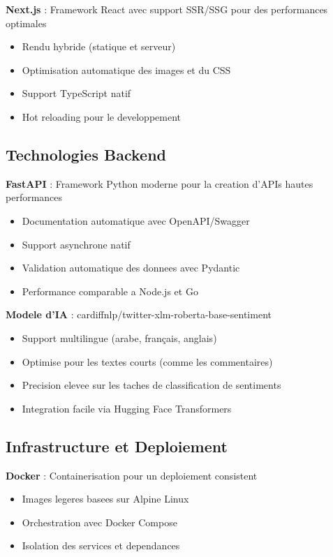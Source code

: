 \textbf{Next.js} : Framework React avec support SSR/SSG pour des performances optimales
\begin{itemize}
    \item Rendu hybride (statique et serveur)
    \item Optimisation automatique des images et du CSS
    \item Support TypeScript natif
    \item Hot reloading pour le developpement
\end{itemize}

\subsection{Technologies Backend}

\textbf{FastAPI} : Framework Python moderne pour la creation d'APIs hautes performances
\begin{itemize}
    \item Documentation automatique avec OpenAPI/Swagger
    \item Support asynchrone natif
    \item Validation automatique des donnees avec Pydantic
    \item Performance comparable a Node.js et Go
\end{itemize}

\textbf{Modele d'IA} : cardiffnlp/twitter-xlm-roberta-base-sentiment \cite{10}
\begin{itemize}
    \item Support multilingue (arabe, français, anglais)
    \item Optimise pour les textes courts (comme les commentaires)
    \item Precision elevee sur les taches de classification de sentiments
    \item Integration facile via Hugging Face Transformers
\end{itemize}

\subsection{Infrastructure et Deploiement}

\textbf{Docker} : Containerisation pour un deploiement consistent
\begin{itemize}
    \item Images legeres basees sur Alpine Linux
    \item Orchestration avec Docker Compose
    \item Isolation des services et dependances
\end{itemize}

